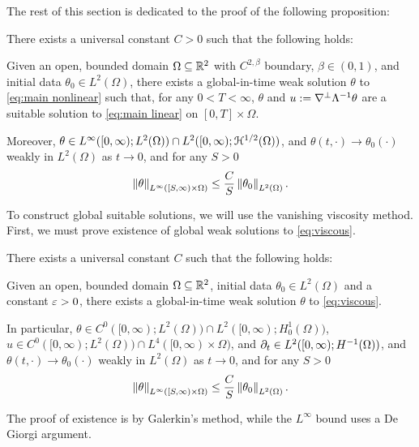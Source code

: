 
The rest of this section is dedicated to the proof of the following proposition:

\begin{proposition} \label{thm:existence}
There exists a universal constant $C > 0$ such that the following holds:

Given an open, bounded domain $\Omega \subseteq \mathbb{R}^2$ with $C^{2,\beta}$ boundary, $\beta \in (0,1)$, and initial data $\theta_0 \in L^2(\Omega)$, there exists a global-in-time weak solution $\theta$ to \eqref{eq:main nonlinear} such that, for any $0 < T < \infty$, $\theta$ and $u := \nabla^\perp \Lambda^{-1} \theta$ are a suitable solution to \eqref{eq:main linear} on $[0,T] \times \Omega$.  

Moreover, $\theta \in L^\infty([0,\infty);L^2(\Omega)) \cap L^2([0,\infty);\mathcal{H}^{1/2}(\Omega))$, and $\theta(t,\cdot) \to \theta_0(\cdot)$ weakly in $L^2(\Omega)$ as $t \to 0$, and for any $S > 0$
\[ \left\lVert\theta\right\rVert_{L^\infty([S,\infty)\times\Omega)} \leq \frac{C}{S} \left\lVert\theta_0\right\rVert_{L^2(\Omega)}. \]
\end{proposition}

To construct global suitable solutions, we will use the vanishing viscosity method.  First, we must prove existence of global weak solutions to \eqref{eq:viscous}.  

\begin{lemma} \label{thm:viscous}
There exists a universal constant $C$ such that the following holds:

Given an open, bounded domain $\Omega \subseteq \mathbb{R}^2$, initial data $\theta_0 \in L^2(\Omega)$ and a constant $\varepsilon > 0$, there exists a global-in-time weak solution $\theta$ to \eqref{eq:viscous}.  

In particular, $\theta \in C^0([0,\infty);L^2(\Omega)) \cap L^2([0,\infty);H_0^1(\Omega))$, $u \in C^0([0,\infty);L^2(\Omega)) \cap L^4([0,\infty)\times\Omega)$, and $\partial_t \in L^2([0,\infty);H^{-1}(\Omega))$, and $\theta(t,\cdot) \to \theta_0(\cdot)$ weakly in $L^2(\Omega)$ as $t \to 0$, and for any $S > 0$
\[ \left\lVert\theta\right\rVert_{L^\infty\left( [S,\infty)\times\Omega \right)} \leq \frac{C}{S} \left\lVert\theta_0\right\rVert_{L^2(\Omega)}. \]
\end{lemma}
The proof of existence is by Galerkin's method, while the $L^\infty$ bound uses a De Giorgi argument.  


